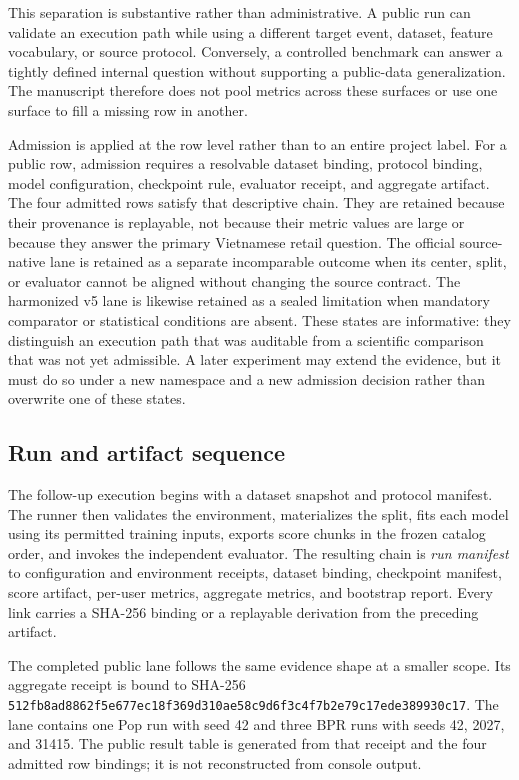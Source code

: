 \documentclass[10pt,a4paper]{article}
\begin{document}
This separation is substantive rather than administrative. A public run can
validate an execution path while using a different target event, dataset,
feature vocabulary, or source protocol. Conversely, a controlled benchmark can
answer a tightly defined internal question without supporting a public-data
generalization. The manuscript therefore does not pool metrics across these
surfaces or use one surface to fill a missing row in another.

Admission is applied at the row level rather than to an entire project label.
For a public row, admission requires a resolvable dataset binding, protocol
binding, model configuration, checkpoint rule, evaluator receipt, and
aggregate artifact. The four admitted rows satisfy that descriptive chain.
They are retained because their provenance is replayable, not because their
metric values are large or because they answer the primary Vietnamese retail
question. The official source-native lane is retained as a separate
incomparable outcome when its center, split, or evaluator cannot be aligned
without changing the source contract. The harmonized v5 lane is likewise
retained as a sealed limitation when mandatory comparator or statistical
conditions are absent. These states are informative: they distinguish an
execution path that was auditable from a scientific comparison that was not
yet admissible. A later experiment may extend the evidence, but it must do so
under a new namespace and a new admission decision rather than overwrite one
of these states.

\subsection{Run and artifact sequence}

The follow-up execution begins with a dataset snapshot and protocol manifest.
The runner then validates the environment, materializes the split, fits each
model using its permitted training inputs, exports score chunks in the frozen
catalog order, and invokes the independent evaluator. The resulting chain is
\textit{run manifest} to configuration and environment receipts, dataset
binding, checkpoint manifest, score artifact, per-user metrics, aggregate
metrics, and bootstrap report. Every link carries a SHA-256 binding or a
replayable derivation from the preceding artifact.

The completed public lane follows the same evidence shape at a smaller scope.
Its aggregate receipt is bound to SHA-256
\texttt{512fb8ad8862f5e677ec18f369d310ae58c9d6f3c4f7b2e79c17ede389930c17}.
The lane contains one Pop run with seed 42 and three BPR runs with seeds 42,
2027, and 31415. The public result table is generated from that receipt and the
four admitted row bindings; it is not reconstructed from console output.
\end{document}
